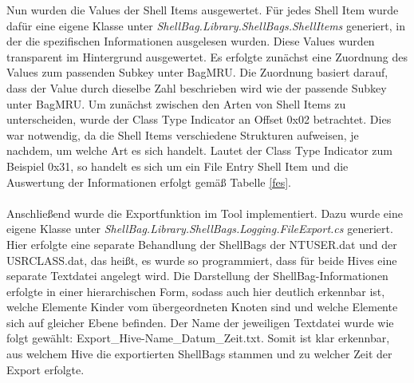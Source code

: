 Nun wurden die Values der Shell Items ausgewertet. Für jedes Shell Item wurde dafür eine eigene Klasse unter \textit{ShellBag.Library.ShellBags.ShellItems} generiert, in der die spezifischen Informationen ausgelesen wurden. Diese Values wurden transparent im Hintergrund ausgewertet. Es erfolgte zunächst eine Zuordnung des Values zum passenden Subkey unter BagMRU. Die Zuordnung basiert darauf, dass der Value durch dieselbe Zahl beschrieben wird wie der passende Subkey unter BagMRU. Um zunächst zwischen den Arten von Shell Items zu unterscheiden, wurde der Class Type Indicator an Offset 0x02 betrachtet. Dies war notwendig, da die Shell Items verschiedene Strukturen aufweisen, je nachdem, um welche Art es sich handelt. Lautet der Class Type Indicator zum Beispiel 0x31, so handelt es sich um ein File Entry Shell Item und die Auswertung der Informationen erfolgt gemäß Tabelle \ref{fes}. \\
\\
Anschließend wurde die Exportfunktion im Tool implementiert. Dazu wurde eine eigene Klasse unter \textit{ShellBag.Library.ShellBags.Logging.FileExport.cs} generiert. Hier erfolgte eine separate Behandlung der ShellBags der NTUSER.dat und der USRCLASS.dat, das heißt, es wurde so programmiert, dass für beide Hives eine separate Textdatei angelegt wird. Die Darstellung der ShellBag-Informationen erfolgte in einer hierarchischen Form, sodass auch hier deutlich erkennbar ist, welche Elemente Kinder vom übergeordneten Knoten sind und welche Elemente sich auf gleicher Ebene befinden. Der Name der jeweiligen Textdatei wurde wie folgt gewählt: \glqq Export\_Hive-Name\_Datum\_Zeit.txt\grqq{}. Somit ist klar erkennbar, aus welchem Hive die exportierten ShellBags stammen und zu welcher Zeit der Export erfolgte.







